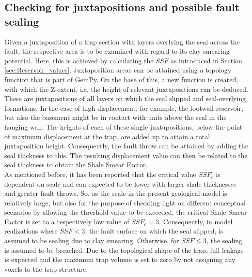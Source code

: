 			\subsection{Checking for juxtapositions and possible fault sealing}\label{sec:check_juxta}
			Given a juxtaposition of a trap section with layers overlying the seal across the fault, the respective area is to be examined with regard to its clay smearing potential. Here, this is achieved by calculating the $SSF$ as introduced in Section \ref{sec:Reservoir_values}. Juxtaposition areas can be attained using a topology function that is part of GemPy. On the base of this, a new function is created, with which the Z-extent, i.e. the height of relevant juxtapositions can be deduced. These are juxtapositions of all layers on which the seal slipped and seal-overlying formations. In the case of high displacement, for example, the footwall reservoir, but also the basement might be in contact with units above the seal in the hanging wall. The  heights of each of these single juxtapositions, below the point of maximum displacement at the trap, are added up to attain a total juxtaposition height. Consequently, the fault throw can be attained by adding the seal thickness to this. The resulting displacement value can then be related to the seal thickness to obtain the Shale Smear Factor.\\
			As mentioned before, it has been reported that the critical value $SSF_c$ is dependent on scale and can expected to be lower with larger shale thicknesses and greater fault throws. So, as the scale in the present geological model is relatively large, but also for the purpose of shedding light on different conceptual scenarios by allowing the threshold value to be exceeded, the critical Shale Smear Factor is set to a respectively low value of $SSF_c = 3$. Consequently, in model realizations where $SSF < 3$, the fault surface on which the seal slipped, is assumed to be sealing due to clay smearing. Otherwise, for $SSF \le 3$, the sealing is assumed to be breached. Due to the topological shape of the trap, full leakage is expected and the maximum trap volume is set to zero by not assigning any voxels to the trap structure.
						
